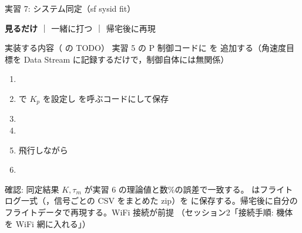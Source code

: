\begin{frame}[fragile]{実習 7: システム同定（sf sysid fit）}
  \vspace{0.15em}

  {\footnotesize \textcolor{sfblue}{\textbf{見るだけ}} ｜ 一緒に打つ ｜ 帰宅後に再現}

  \vspace{0.3em}

  \begin{block}{実装する内容（ の TODO）}\footnotesize
    実習 5 の P 制御コードに  を
    追加する（角速度目標を Data Stream に記録するだけで，制御自体には無関係）
  \end{block}

  \begin{enumerate}\footnotesize\setlength{\itemsep}{0pt}
    \item {}
    \item {} で $K_p$ を設定し  を呼ぶコードにして保存
    \item {}
    \item {}
    \item 飛行しながら 
    \item {}
  \end{enumerate}

  {\footnotesize 確認: 同定結果 $K,\tau_m$ が実習 6 の理論値と数\%の誤差で一致する。
   はフライトログ一式（，信号ごとの CSV をまとめた zip）を
   に保存する。帰宅後に自分のフライトデータで再現する。WiFi 接続が前提
  （セッション2「接続手順: 機体を WiFi 網に入れる」）}
\end{frame}

